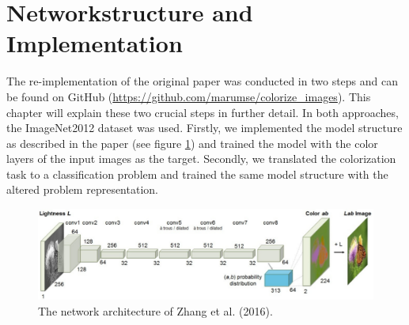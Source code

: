\documentclass[12pt,letterpaper]{article}
\begin{document}
\section{Networkstructure and Implementation}
The re-implementation of the original paper \citep{Zhang.2016} was conducted in two steps and can be found on GitHub (\url{https://github.com/marumse/colorize_images}). This chapter will explain these two crucial steps in further detail. In both approaches, the ImageNet2012 dataset was used. Firstly, we implemented the model structure as described in the paper (see figure \ref{network}) and trained the model with the color layers of the input images as the target. Secondly, we translated the colorization task to a classification problem and trained the same model structure with the altered problem representation.
\begin{figure}[hb]
	\centering
	\includegraphics[width=1.0\textwidth]{layer.png}
	\caption{The network architecture of Zhang et al. (2016). }
	\label{network}
\end{figure}
\end{document}
